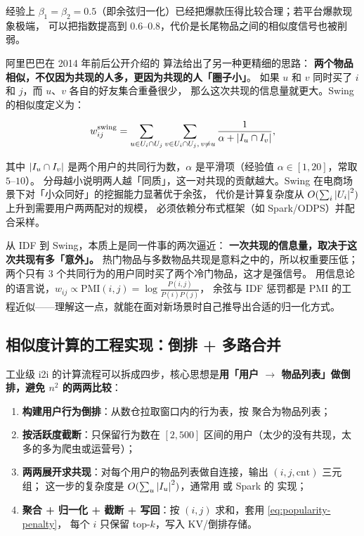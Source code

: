 经验上 $\beta_1 = \beta_2 = 0.5$（即余弦归一化）已经把爆款压得比较合理；若平台爆款现象极端，
可以把指数提高到 0.6--0.8，代价是长尾物品之间的相似度信号也被削弱。

阿里巴巴在 2014 年前后公开介绍的  算法给出了另一种更精细的思路：
\textbf{两个物品相似，不仅因为共现的人多，更因为共现的人「圈子小」}。
如果 $u$ 和 $v$ 同时买了 $i$ 和 $j$，而 $u$、$v$ 各自的好友集合重叠很少，
那么这次共现的信息量就更大。Swing 的相似度定义为：

\begin{equation}
w_{ij}^{\mathrm{swing}} = \sum_{u \in U_i \cap U_j} \sum_{v \in U_i \cap U_j, \, v \ne u}
\frac{1}{\alpha + \left\lvert I_u \cap I_v \right\rvert} ,
\label{eq:swing}
\end{equation}

其中 $\left\lvert I_u \cap I_v \right\rvert$ 是两个用户的共同行为数，$\alpha$ 是平滑项（经验值 $\alpha \in [1, 20]$，常取 $5$--$10$）。
分母越小说明两人越「同质」，这一对共现的贡献越大。Swing 在电商场景下对「小众同好」的挖掘能力显著优于余弦，
代价是计算复杂度从 $O(\sum_i \left\lvert U_i \right\rvert^2)$ 上升到需要用户两两配对的规模，
必须依赖分布式框架（如 Spark/ODPS）并配合采样。

\begin{insight}
从 IDF 到 Swing，本质上是同一件事的两次逼近：
\textbf{一次共现的信息量，取决于这次共现有多「意外」。}
热门物品与多数物品共现是意料之中的，所以权重要压低；
两个只有 3 个共同行为的用户同时买了两个冷门物品，这才是强信号。
用信息论的语言说，$w_{ij} \propto \mathrm{PMI}(i, j) = \log \frac{P(i,j)}{P(i)P(j)}$，
余弦与 IDF 惩罚都是 PMI 的工程近似——理解这一点，就能在面对新场景时自己推导出合适的归一化方式。
\end{insight}

\subsection{相似度计算的工程实现：倒排 + 多路合并}

工业级 i2i 的计算流程可以拆成四步，核心思想是\textbf{用「用户 $\to$ 物品列表」做倒排，避免 $n^2$ 的两两比较}：

\begin{enumerate}
  \item \textbf{构建用户行为倒排}：从数仓拉取窗口内的行为表，按  聚合为物品列表；
  \item \textbf{按活跃度截断}：只保留行为数在 $[2, 500]$ 区间的用户（太少的没有共现，太多的多为爬虫或运营号）；
  \item \textbf{两两展开求共现}：对每个用户的物品列表做自连接，输出 $(i, j, \text{cnt})$ 三元组；
        这一步的复杂度是 $O(\sum_u \left\lvert I_u \right\rvert^2)$，通常用  或 Spark 的  实现；
  \item \textbf{聚合 + 归一化 + 截断 + 写回}：按 $(i,j)$ 求和，套用 \cref{eq:popularity-penalty}，
        每个 $i$ 只保留 top-$k$，写入 KV/倒排存储。
\end{enumerate}

